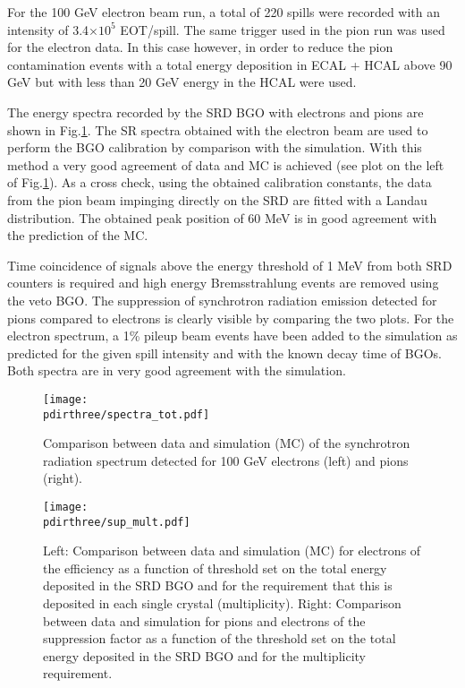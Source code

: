 For the 100 GeV electron beam run, a total of 220 spills were recorded with an intensity of 3.4$\times 10^5$ EOT/spill. 
The same trigger used in the pion run was used for the electron data.
In this case however, in order to reduce the pion contamination events with a total energy deposition in ECAL + HCAL above 90 GeV but with less than 20 GeV energy in the HCAL were used.  

The energy spectra recorded by the SRD BGO with electrons and pions are shown in Fig.\ref{fig:comp_spectra}. The SR spectra obtained with the electron beam are used to perform the BGO calibration by comparison with the simulation. With this method a very good agreement of data and MC is achieved (see plot on the left of Fig.\ref{fig:comp_spectra}). As a cross check, using the obtained calibration constants, the data from the pion beam impinging directly on the SRD are fitted with a Landau distribution. The obtained peak position of 60 MeV is in good agreement with the prediction of the MC. 

Time coincidence of signals above the energy threshold of 1 MeV from both SRD counters is required and high energy Bremsstrahlung events are removed using the veto BGO.
The suppression of synchrotron radiation emission detected for pions compared to electrons is clearly visible by comparing the two plots. For the electron spectrum, a 1\% pileup beam events have been added to the simulation as predicted for the given spill intensity and with the known decay time of BGOs.  Both spectra are in very good agreement with the simulation.

\begin{figure}[htb!]
  \centering
  \texttt{[image: \\pdirthree/spectra\_tot.pdf]}
  \caption[SRD comparison between data and MC]{Comparison between data and simulation (MC) of the synchrotron radiation spectrum detected for 100 GeV electrons (left) and pions (right). }
  \label{fig:comp_spectra}
\end{figure} 

\begin{figure}[htb!]
  \centering
  \texttt{[image: \\pdirthree/sup\_mult.pdf]}
  \caption[efficiency and rejection power of the SRD cut]{Left: Comparison between data and simulation (MC) for electrons of the efficiency as a function of threshold set on the total energy deposited in the SRD BGO and for the requirement that this is deposited in each single crystal (multiplicity). Right: Comparison between data and simulation for pions and electrons of the suppression factor as a function of the threshold set on the total energy deposited in the SRD BGO and for the multiplicity requirement.}
  \label{fig:sup_mult}
\end{figure}

